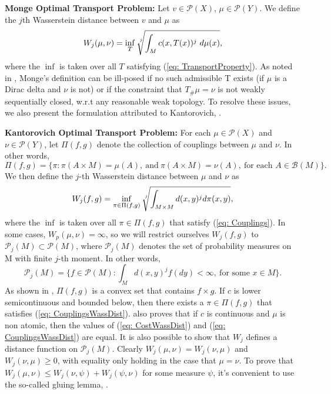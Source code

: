 \documentclass[10pt]{article}
\begin{document}
\noindent \textbf{Monge Optimal Transport Problem:} Let $v \in \mathcal{P}(X)$, $\mu \in \mathcal{P}(Y).$ We define the $j$th Wasserstein distance between $v$ and $\mu$ as
\begin{equation}
W_j(\mu,\nu) = \inf_{T} \sqrt[\leftroot{-2}\uproot{2}j]{\int_{M}c(x, T(x))^{j} \ d\mu(x)},
\label{eq: CostWassDist}
\end{equation}
where the $\inf$ is taken over all $T$ satisfying (\ref{eq: TransportProperty}). As noted in \cite{AN}, Monge's definition can be ill-posed if no such admissible T exists (if $\mu$ is a Dirac delta and $\nu$ is not) or if the constraint that $T_{\#}\mu = \nu$ is not weakly sequentially closed, w.r.t any reasonable weak topology. To resolve these issues, we also present the formulation attributed to Kantorovich, \cite{AN}.

\noindent \textbf{Kantorovich Optimal Transport Problem:}
\noindent For each $\mu \in \mathcal{P}(X)$ and $\nu \in \mathcal{P}(Y)$, let $\Pi(f,g)$ denote the collection of couplings between $\mu$ and $\nu$. In other words, 
\begin{equation}
\Pi(f, g) = \Big\{\pi: \pi(A \times M) = \mu(A), \ \text{and} \ \pi(A \times M) = \nu(A), \ \text{for each $A \in \mathcal{B}(M)$}  \Big\}.
\label{eq: Couplings}
\end{equation}
We then define the $j$-th Wasserstein distance between $\mu$ and $\nu$ as 
\begin{equation}
W_j(f, g) = \inf_{\pi \in \Pi(f, g)}\sqrt[\leftroot{-2}\uproot{2}j]{\int_{M \times M} d(x,y)^{j} d\pi(x, y)},
\label{eq: CouplingsWassDist}
\end{equation}
where the $\inf$ is taken over all $\pi \in \Pi(f, g)$ that satisfy (\ref{eq: Couplings}). In some cases, $W_p(\mu, \nu) = \infty$, so we will restrict ourselves $W_j(f, g)$ to $\mathcal{P}_j(M) \subset \mathcal{P}(M)$, where $\mathcal{P}_j(M)$ denotes the set of probability measures on M with finite $j$-th moment. In other words, 
\begin{equation}
\mathcal{P}_j(M) = \Big\{f \in \mathcal{P}(M): \int_M d(x, y)^j f(dy) < \infty, \ \text{for some $x \in M$} \Big\}.
\label{eq: jPM}
\end{equation}
As shown in \cite{AN}, $\Pi(f, g)$ is a convex set that contains $f \times g$.  If $c$ is lower semicontinuous and bounded below, then there exists a $\pi \in \Pi(f, g)$ that satisfies (\ref{eq: CouplingsWassDist}). \cite{AN} also proves that if $c$ is continuous and $\mu$ is non atomic, then the values of (\ref{eq: CostWassDist}) and (\ref{eq: CouplingsWassDist}) are equal.
It is also possible to show that $W_{j}$ defines a distance function on $\mathcal{P}_j(M)$. Clearly $W_{j}(\mu, \nu) = W_{j}(\nu, \mu)$ and $W_{j}(\nu, \mu) \geq 0$, with equality only holding in the case that $\mu = \nu$. To prove that $W_{j}(\mu, \nu) \leq W_{j}(\nu, \psi) + W_{j}(\psi, \nu)$ for some measure $\psi$, it's convenient to use the so-called gluing lemma, \cite{CVillani}.
\end{document}
